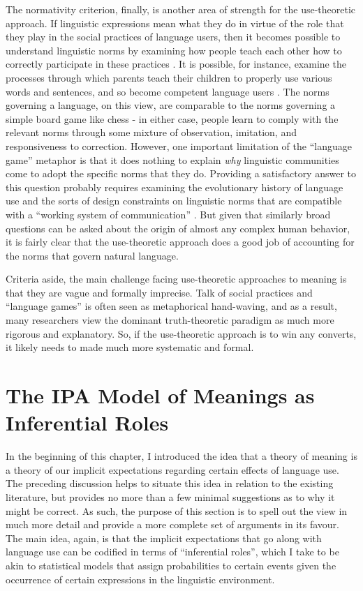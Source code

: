 The normativity criterion, finally, is another area of strength for the use-theoretic approach. If linguistic expressions mean what they do in virtue of the role that they play in the social practices of language users, then it becomes possible to understand linguistic norms by examining how people teach each other how to correctly participate in these practices \citep{Brandom:1994,Wittgenstein:1953,Kripke:1982}. It is possible, for instance, examine the processes through which parents teach their children to properly use various words and sentences, and so become competent language users \citep{Brandom:2010,Sellars:1954}. The norms governing a language, on this view, are comparable to the norms governing a simple board game like chess - in either case, people learn to comply with the relevant norms through some mixture of observation, imitation, and responsiveness to correction. However, one important limitation of the ``language game'' metaphor is that it does nothing to explain \textit{why} linguistic communities come to adopt the specific norms that they do. Providing a satisfactory answer to this question probably requires examining the evolutionary history of language use and the sorts of design constraints on linguistic norms that are compatible with a ``working system of communication'' \citep[][p. 54]{Dennett:2010}. But given that similarly broad questions can be asked about the origin of almost any complex human behavior, it is fairly clear that the use-theoretic approach does a good job of accounting for the norms that govern natural language.

Criteria aside, the main challenge facing use-theoretic approaches to meaning is that they are vague and formally imprecise. Talk of social practices and ``language games'' is often seen as metaphorical hand-waving, and as a result, many researchers view the dominant truth-theoretic paradigm as much more rigorous and explanatory. So, if the use-theoretic approach is to win any converts, it likely needs to made much more systematic and formal. 

\section{The IPA Model of Meanings as Inferential Roles}

In the beginning of this chapter, I introduced the idea that a theory of meaning is a theory of our implicit expectations regarding certain effects of language use. The preceding discussion helps to situate this idea in relation to the existing literature, but provides no more than a few minimal suggestions as to why it might be correct. As such, the purpose of this section is to spell out the view in much more detail and provide a more complete set of arguments in its favour. The main idea, again, is that the implicit expectations that go along with language use can be codified in terms of ``inferential roles'', which I take to be akin to statistical models that assign probabilities to certain events given the occurrence of certain expressions in the linguistic environment.

